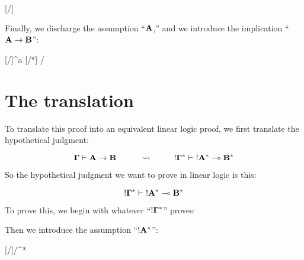 \documentclass[../../../main.tex]{subfiles}
\begin{document}
\begin{prooftree*}
  \hypo{}
  \ellipsis{}{\Proof/}
  \ellipsis{}{}
  \hypo{}
  [\startrule/]{}
  \ellipsis{}{}
\end{prooftree*}

\noindent
Finally, we discharge the assumption ``$\mathbf{A}$,'' and we introduce the implication ``$\nd{A} \impl/ \nd{B}$'':

\begin{prooftree*}
  \hypo{}
  \ellipsis{}{\Proof/}
  \ellipsis{}{}
  \hypo{}
  [\startrule/]{^{a}}
  \ellipsis{}{}
  [\implIntro/$^{a}$]{ \impl/ }
\end{prooftree*}


\section{The translation}

To translate this proof into an equivalent linear logic proof, we first translate the hypothetical judgment:

\begin{equation*}
  \nd{\context/} \ndturnstile/ \nd{A} \impl/ \nd{B}
  \hskip 1cm \rightsquigarrow \hskip 1cm
  \bang/\nd{\context/}^{*} \ndturnstile/~\bang/\nd{A}^{*} \lolli/ \nd{B}^{*}
\end{equation*}

\noindent
So the hypothetical judgment we want to prove in linear logic is this:

\begin{equation*}
  \bang/\nd{\context/}^{*} \ndturnstile/~\bang/\nd{A}^{*} \lolli/ \nd{B}^{*}
\end{equation*}

\noindent
To prove this, we begin with whatever ``$\bang/\nd{\Gamma}^{*}$'' proves:

\begin{prooftree*}
  \hypo{}
  \ellipsis{}{\Proof/}
  \ellipsis{}{}
\end{prooftree*}

\noindent
Then we introduce the assumption ``$\bang/\nd{A}^{*}$'':

\begin{prooftree*}
  \hypo{}
  \ellipsis{}{\Proof/}
  \ellipsis{}{}
  \hypo{}
  [\startrule/]{\bang/^{*}}
\end{prooftree*}
\end{document}
